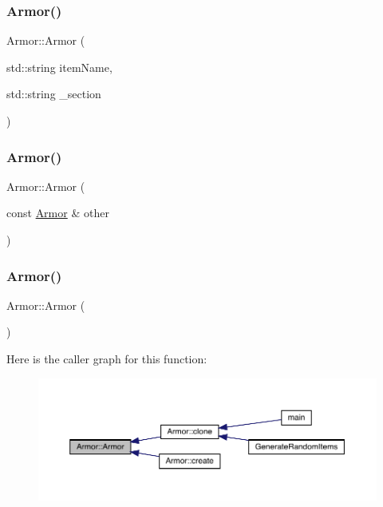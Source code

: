 \mbox{\label{class_armor_a1a1bc35d82ebba3f5a81f9e40d93f3c9}} 
\subsubsection{\texorpdfstring{Armor()}{Armor()}\hspace{0.1cm}{\footnotesize\ttfamily [3/5]}}
{\footnotesize\ttfamily Armor\+::\+Armor (\begin{DoxyParamCaption}\item[{std\+::string}]{item\+Name,  }\item[{std\+::string}]{\+\_\+section }\end{DoxyParamCaption})}

\mbox{\label{class_armor_a40d54a621183a93edaecb2cd4e83c800}} 
\subsubsection{\texorpdfstring{Armor()}{Armor()}\hspace{0.1cm}{\footnotesize\ttfamily [4/5]}}
{\footnotesize\ttfamily Armor\+::\+Armor (\begin{DoxyParamCaption}\item[{const \mbox{\hyperlink{class_armor}{Armor}} \&}]{other }\end{DoxyParamCaption})}

\mbox{\label{class_armor_a23323e95bbeb488eb6fe54cbd83d49a2}} 
\subsubsection{\texorpdfstring{Armor()}{Armor()}\hspace{0.1cm}{\footnotesize\ttfamily [5/5]}}
{\footnotesize\ttfamily Armor\+::\+Armor (\begin{DoxyParamCaption}{ }\end{DoxyParamCaption})}

Here is the caller graph for this function\+:
\nopagebreak
\begin{figure}[H]
\begin{center}
\leavevmode
\includegraphics[width=350pt]{d9/d76/class_armor_a23323e95bbeb488eb6fe54cbd83d49a2_icgraph}
\end{center}
\end{figure}


